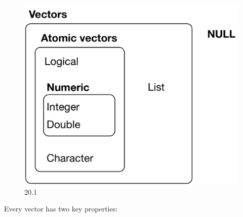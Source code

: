 \documentclass[
]{book}
\begin{document}
\begin{figure}
\centering
\includegraphics{./images/vector_hierarchy.png}
\caption{20.1}
\end{figure}

Every vector has two key properties:
\end{document}

